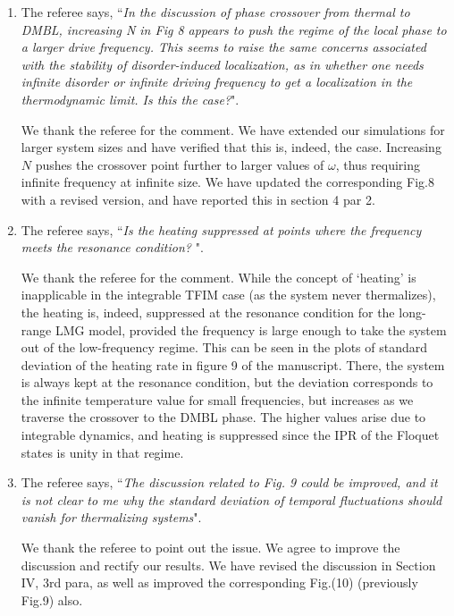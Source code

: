 \documentclass[aps,prb,reprint,showpacs,floatfix,superscriptaddress, onecolumn, nofootinbib, 9pt]{revtex4-2}
\newcommand{\response}[1]{{\color{black}#1}} %
\newcommand{\comment}[1]{{\color{blue}#1}} %
\begin{document}
\begin{enumerate}
\item The referee says, \comment{``\textit{In the discussion of phase crossover from thermal to DMBL, increasing N in Fig 8 appears to push the regime of the local phase to a larger drive frequency. This seems to raise the same concerns associated with the stability of disorder-induced localization, as in whether one needs infinite disorder or infinite driving frequency to get a localization in the thermodynamic limit. Is this the case?}"}.

\response{    	
We thank the referee for the comment. We have extended our simulations for larger system sizes and have verified that this is, indeed, the case. Increasing $N$ pushes the crossover point further to larger values of $\omega$, thus requiring infinite frequency at infinite size. We have updated the corresponding Fig.8 with a revised version, and have reported this in section 4 par 2.
}
\item The referee says, \comment{``\textit{Is the heating suppressed at points where the frequency meets the resonance condition? }"}.

\response{
We thank the referee for the comment. While the concept of `heating' is inapplicable in the integrable TFIM case (as the system never thermalizes), the heating is, indeed, suppressed at the resonance condition for the long-range LMG model, provided the frequency is large enough to take the system out of the low-frequency regime. This can be seen in the plots of standard deviation of the heating rate in figure 9 of the manuscript. There, the system is always kept at the resonance condition, but the deviation corresponds to the infinite temperature value for small frequencies, but increases as we traverse the crossover to the DMBL phase. The higher values arise due to integrable dynamics, and heating is suppressed since the IPR of the Floquet states is unity in that regime.}

\item The referee says, \comment{``\textit{The discussion related to Fig. 9 could be improved, and it is not clear to me why the standard deviation of temporal fluctuations should vanish for thermalizing systems}"}.\\

\response{ We thank the referee to point out the issue. We agree to improve the discussion and rectify our results. We have revised the discussion in Section IV, 3rd para, as well as improved the corresponding Fig.(10) (previously Fig.9) also\todo{check the Fig number}.
	
}
\end{enumerate}
\end{document}
